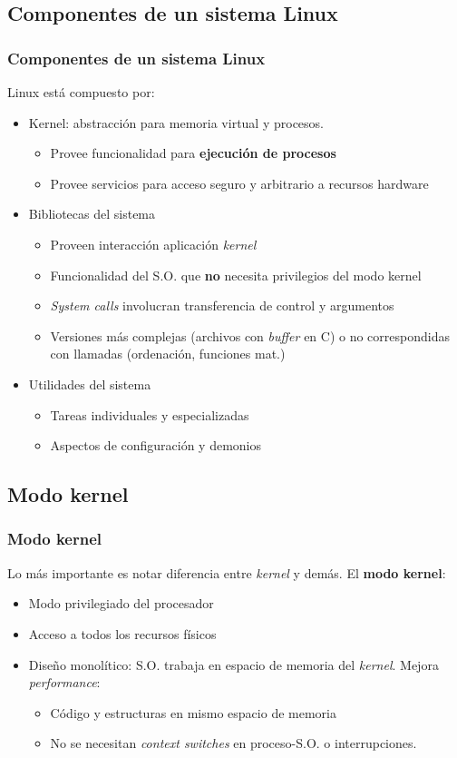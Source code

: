 \documentclass[spanish]{beamer}
\begin{document}
	\subsection{Componentes de un sistema Linux}
	\frame
	{
		\frametitle{Componentes de un sistema Linux}	
		Linux está compuesto por:
		\begin{itemize}
			\item Kernel: abstracción para memoria virtual y procesos. 
				\begin{itemize}
					\item Provee funcionalidad para \textbf{ejecución de procesos}
					\item Provee servicios para acceso seguro y arbitrario a recursos hardware
				\end{itemize}
			\item Bibliotecas del sistema
				\begin{itemize}
					\item Proveen interacción aplicación \textit{kernel}
					\item Funcionalidad del S.O. que \textbf{no} necesita privilegios del modo kernel
					\item \textit{System calls} involucran transferencia de control y argumentos
					\item Versiones más complejas (archivos con \textit{buffer} en C) o no correspondidas con llamadas (ordenación, funciones mat.)
				\end{itemize}
			\item Utilidades del sistema
				\begin{itemize}
					\item Tareas individuales y especializadas
					\item Aspectos de configuraci\'{o}n y demonios
				\end{itemize}
		\end{itemize}
	}	
	
	\subsection{Modo kernel}
	\frame
	{
		\frametitle{Modo kernel}
		Lo más importante es notar diferencia entre \textit{kernel} y demás. El \textbf{modo kernel}:
		\begin{itemize}
			\item Modo privilegiado del procesador
			\item Acceso a todos los recursos físicos
			\item Diseño monolítico: S.O. trabaja en espacio de memoria del \textit{kernel}. Mejora \textit{performance}:
			\begin{itemize}
				\item Código y estructuras en mismo espacio de memoria
				\item No se necesitan \textit{context switches} en proceso-S.O. o interrupciones.
			\end{itemize}
		\end{itemize}
	}
	
\end{document}
